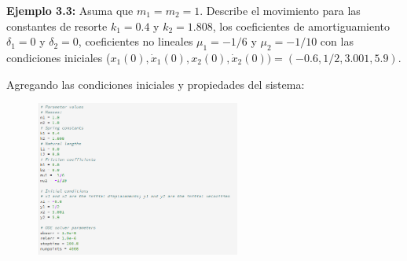 \documentclass[a4paper]{article}
\begin{document}
\begin{center}
\pagebreak

\textbf{Ejemplo 3.3:} Asuma que $m_1 = m_2 = 1$. Describe el movimiento para las constantes de resorte $k_1 = 0.4$ y $k_2 = 1.808$, los coeficientes de amortiguamiento $\delta_1 = 0$ y $\delta_2 = 0$, coeficientes no lineales $\mu_1 = -1/6$ y $\mu_2 = -1/10$ con las condiciones iniciales ($x_1(0), \dot x_1(0), x_2(0), \dot x_2(0)) = (-0.6,1/2,3.001,5.9)$.

Agregando las condiciones iniciales y propiedades del sistema:
\begin{figure}[ht!]
 \centering
  \includegraphics[width=0.6\textwidth]{Codigo5_2.PNG}
\end{figure}


\end{center}
\end{document}

